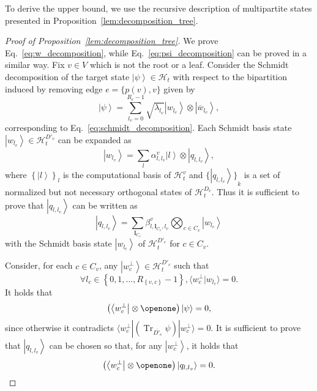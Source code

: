 \documentclass[preprintnumbers,aps,amsmath,amssymb,pra,twocolumn,showpacs,superscriptaddress,floatfix]{revtex4-1}
\def\Bra#1{\left\langle#1\right|}
\def\Ket#1{\left|#1\right\rangle}
\DeclareMathOperator{\tr}{Tr}
\theoremstyle{plain}
\theoremstyle{definition}
\theoremstyle{remark}
\begin{document}
To derive the upper bound, we use the recursive description of multipartite states presented in Proposition~\ref{lem:decomposition_tree}.
\begin{proof}[Proof of Proposition~\ref{lem:decomposition_tree}]
    We prove Eq.~\eqref{eq:w_decomposition}, while Eq.~\eqref{eq:psi_decomposition} can be proved in a similar way.
    Fix $v\in V$ which is not the root or a leaf.   Consider the Schmidt decomposition of the target state $\Ket{\psi}\in\mathcal{H}_t$ with respect to the bipartition induced by removing edge $e=\{p(v),v\}$ given by 
\[
\Ket\psi = \sum_{l_v=0}^{R_e-1}\sqrt{\lambda_{l_v}}\Ket{w_{l_v}}\otimes\Ket{\overline{w}_{l_v}},
\] 
corresponding to Eq.~\eqref{eq:schmidt_decomposition}. Each Schmidt basis state $\Ket{w_{l_v}} \in \mathcal{H}^{D'_v}_t$ can be expanded as
\begin{equation}
\label{eq:w_to_l_and_q}
    \Ket{w_{l_v}} = \sum_{l}\alpha_{l,l_v}^{v}\Ket{l}\otimes\Ket{q_{l, l_v}},
\end{equation}
where ${\left\{\Ket{l}\right\}}_l$ is the computational basis of $\mathcal{H}^v_t$ and ${\{ \Ket{q_{l, l_v}}\}}_k$ is a set of normalized but not necessary orthogonal states of $\mathcal{H}^{D_v}_t$.   Thus it is sufficient to prove that $\Ket{q_{l, l_v}}$ can be written as
    \begin{equation}
        \Ket{q_{l, l_v}} =
        \sum_{\boldsymbol{l}_{C_v}}
        \beta_{l,\boldsymbol{l}_{C_v},l_v}^{v}  \bigotimes_{c\in C_v}\Ket{w_{l_c}}
        \label{eq:q_l_m_v_k}
    \end{equation}
    with the Schmidt basis state $\Ket{w_{l_c}}$ of $\mathcal{H}^{D'_c}_t$ for $c \in C_v$.

    Consider, for each $c\in C_v$, any $\Ket{w_c^{\perp}}\in\mathcal{H}^{D'_c}_t$ such that
\[
    \forall l_c\in\left\{0,1,\ldots,R_{\left\{v,c\right\}}-1\right\}, \langle w_c^{\perp}|w_{l_c}\rangle = 0.
\]
    It holds that
    \[
        \left(\Bra{w_c^{\perp}}\otimes \openone\right)\Ket{\psi} = 0,
    \]
    since otherwise it contradicts $\langle w_c^{\perp}|\left(\tr_{\overline{D'_c}}\psi\right)|w_c^{\perp}\rangle=0$.
    It is sufficient to prove that $\Ket{q_{l, l_v}}$ can be chosen so that, for any $\Ket{w_c^{\perp}}$, it holds that
    \[
        \left(\Bra{w_c^{\perp}}\otimes \openone\right)\Ket{q_{l, l_v}} = 0.
    \]


\end{proof}
\end{document}
